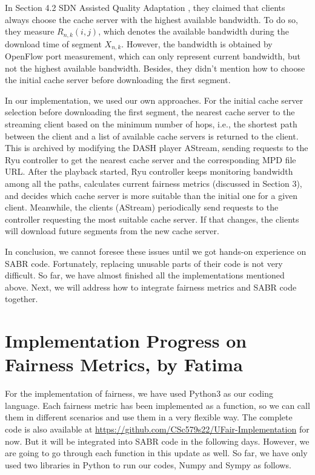 \documentclass{article}
\begin{document}
In Section 4.2 SDN Assisted Quality Adaptation \cite{bhat_network_2017}, they claimed that clients always choose the cache server with the highest available bandwidth. To do so, they measure $R_{n,k}(i,j)$, which denotes the available bandwidth during the download time of segment $X_{n,k}$. However, the bandwidth is obtained by OpenFlow port measurement, which can only represent current bandwidth, but not the highest available bandwidth. Besides, they didn't mention how to choose the initial cache server before downloading the first segment. 

In our implementation, we used our own approaches. For the initial cache server selection before downloading the first segment, the nearest cache server to the streaming client based on the minimum number of hops, i.e., the shortest path between the client and a list of available cache servers is returned to the client. This is archived by modifying the DASH player AStream, sending requests to the Ryu controller to get the nearest cache server and the corresponding MPD file URL. After the playback started, Ryu controller keeps monitoring bandwidth among all the paths, calculates current fairness metrics (discussed in Section 3), and decides which cache server is more suitable than the initial one for a given client. Meanwhile, the clients (AStream) periodically send requests to the controller requesting the most suitable cache server. If that changes, the clients will download future segments from the new cache server. 

In conclusion, we cannot foresee these issues until we got hands-on experience on SABR code. Fortunately, replacing unusable parts of their code is not very difficult. So far, we have almost finished all the implementations mentioned above. Next, we will address how to integrate fairness metrics and SABR code together. 

\section{Implementation Progress on Fairness Metrics, by Fatima}
For the implementation of fairness, we have used Python3 as our coding language. Each fairness metric has been implemented as a function, so we can call them in different scenarios and use them in a very flexible way. The complete code is also available at \url{https://github.com/CSc579s22/UFair-Implementation} for now. But it will be integrated into SABR code in the following days. However, we are going to go through each function in this update as well. So far, we have only used two libraries in Python to run our codes, Numpy and Sympy as follows.
\end{document}
